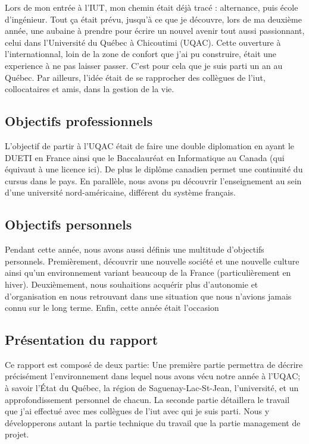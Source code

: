 Lors de mon entrée à l'IUT, mon chemin était déjà tracé : alternance, puis école d'ingénieur. Tout ça était prévu, jusqu'à ce que je découvre, lors de ma deuxième année, une aubaine à prendre pour écrire un nouvel avenir tout aussi passionnant, celui dans l'Université du Québec à Chicoutimi (UQAC). Cette ouverture à l'internationnal, loin de la zone de confort que j'ai pu construire, était une experience à ne pas laisser passer. C'est pour cela que je suis parti un an au Québec.
Par ailleurs, l'idée était de se rapprocher des collègues de l'iut, collocataires et amis, dans la gestion de la vie.

\subsection{Objectifs professionnels}

L'objectif de partir à l'UQAC était de faire une double diplomation en ayant le DUETI en France ainsi que le Baccalauréat en Informatique au Canada (qui équivaut à une licence ici). De plus le diplôme canadien permet une continuité du cursus dans le pays. En parallèle, nous avons pu découvrir l'enseignement au sein d'une université nord-américaine, différent du système français.

\subsection{Objectifs personnels}

Pendant cette année, nous avons aussi définis une multitude d'objectifs personnels.
Premièrement, découvrir une nouvelle société et une nouvelle culture ainsi qu'un environnement variant beaucoup de la France (particulièrement en hiver). 
Deuxièmement, nous souhaitions acquérir plus d'autonomie et d'organisation en nous retrouvant dans une situation que nous n'avions jamais connu sur le long terme.
Enfin, cette année était l'occasion

\subsection{Présentation du rapport}

Ce rapport est composé de deux partie:\newline
Une première partie permettra de décrire précisément l’environnement dans lequel nous avons vécu notre année à l’UQAC; à savoir l’État du Québec, la région de Saguenay-Lac-St-Jean, l’université, et un approfondissement personnel de chacun.\newline
La seconde partie détaillera le travail que j’ai effectué avec mes collègues de l'iut avec qui je suis parti. Nous y
développerons autant la partie technique du travail que la partie management de projet.

